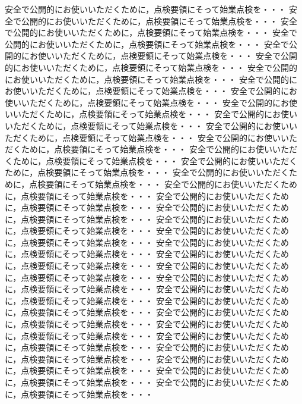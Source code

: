 \documentclass[11pt]{ltjsarticle}
\begin{document}
安全で公開的にお使いいただくために，点検要領にそって始業点検を・・・
安全で公開的にお使いいただくために，点検要領にそって始業点検を・・・
安全で公開的にお使いいただくために，点検要領にそって始業点検を・・・
安全で公開的にお使いいただくために，点検要領にそって始業点検を・・・
安全で公開的にお使いいただくために，点検要領にそって始業点検を・・・
安全で公開的にお使いいただくために，点検要領にそって始業点検を・・・
安全で公開的にお使いいただくために，点検要領にそって始業点検を・・・
安全で公開的にお使いいただくために，点検要領にそって始業点検を・・・
安全で公開的にお使いいただくために，点検要領にそって始業点検を・・・
安全で公開的にお使いいただくために，点検要領にそって始業点検を・・・
安全で公開的にお使いいただくために，点検要領にそって始業点検を・・・
安全で公開的にお使いいただくために，点検要領にそって始業点検を・・・
安全で公開的にお使いいただくために，点検要領にそって始業点検を・・・
安全で公開的にお使いいただくために，点検要領にそって始業点検を・・・
安全で公開的にお使いいただくために，点検要領にそって始業点検を・・・
安全で公開的にお使いいただくために，点検要領にそって始業点検を・・・
安全で公開的にお使いいただくために，点検要領にそって始業点検を・・・
安全で公開的にお使いいただくために，点検要領にそって始業点検を・・・
安全で公開的にお使いいただくために，点検要領にそって始業点検を・・・
安全で公開的にお使いいただくために，点検要領にそって始業点検を・・・
安全で公開的にお使いいただくために，点検要領にそって始業点検を・・・
安全で公開的にお使いいただくために，点検要領にそって始業点検を・・・
安全で公開的にお使いいただくために，点検要領にそって始業点検を・・・
安全で公開的にお使いいただくために，点検要領にそって始業点検を・・・
安全で公開的にお使いいただくために，点検要領にそって始業点検を・・・
安全で公開的にお使いいただくために，点検要領にそって始業点検を・・・
安全で公開的にお使いいただくために，点検要領にそって始業点検を・・・
安全で公開的にお使いいただくために，点検要領にそって始業点検を・・・
安全で公開的にお使いいただくために，点検要領にそって始業点検を・・・
安全で公開的にお使いいただくために，点検要領にそって始業点検を・・・
安全で公開的にお使いいただくために，点検要領にそって始業点検を・・・
安全で公開的にお使いいただくために，点検要領にそって始業点検を・・・
安全で公開的にお使いいただくために，点検要領にそって始業点検を・・・
安全で公開的にお使いいただくために，点検要領にそって始業点検を・・・
\end{document}
